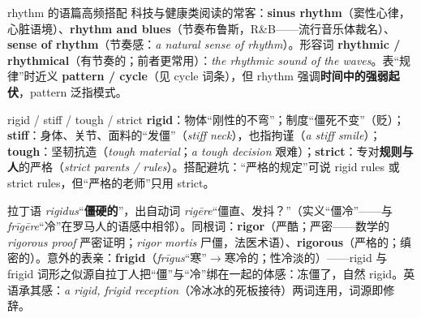 \documentclass[../main.tex]{subfiles}
\begin{document}

\begin{gram}{rhythm 的语篇高频搭配}
科技与健康类阅读的常客：\textbf{sinus rhythm}（窦性心律，心脏语境）、\textbf{rhythm and blues}（节奏布鲁斯，R\&B——流行音乐体裁名）、\textbf{sense of rhythm}（节奏感：\textit{a natural sense of rhythm}）。形容词 \textbf{rhythmic / rhythmical}（有节奏的；前者更常用）：\textit{the rhythmic sound of the waves}。表“规律”时近义 \textbf{pattern / cycle}（见 cycle 词条），但 rhythm 强调\textbf{时间中的强弱起伏}，pattern 泛指模式。
\end{gram}



\begin{gram}{rigid / stiff / tough / strict}
\textbf{rigid}：物体“刚性的不弯”；制度“僵死不变”（贬）；\textbf{stiff}：身体、关节、面料的“发僵”（\textit{stiff neck}），也指拘谨（\textit{a stiff smile}）；\textbf{tough}：坚韧抗造（\textit{tough material}；\textit{a tough decision} 艰难）；\textbf{strict}：专对\textbf{规则与人}的严格（\textit{strict parents / rules}）。搭配避坑：“严格的规定”可说 rigid rules 或 strict rules，但“严格的老师”只用 strict。
\end{gram}

\begin{origin}
拉丁语 \textit{rigidus}“\textbf{僵硬的}”，出自动词 \textit{rigēre}“僵直、发抖？”（实义“僵冷”——与 \textit{frīgēre}“冷”在罗马人的语感中相邻）。同根词：\textbf{rigor}（严酷；严密——数学的 \textit{rigorous proof} 严密证明；\textit{rigor mortis} 尸僵，法医术语）、\textbf{rigorous}（严格的；缜密的）。意外的表亲：\textbf{frigid}（\textit{frīgus}“寒”$\to$寒冷的；性冷淡的）——rigid 与 frigid 词形之似源自拉丁人把“僵”与“冷”绑在一起的体感：冻僵了，自然 rigid。英语承其感：\textit{a rigid, frigid reception}（冷冰冰的死板接待）两词连用，词源即修辞。
\end{origin}
\end{document}
